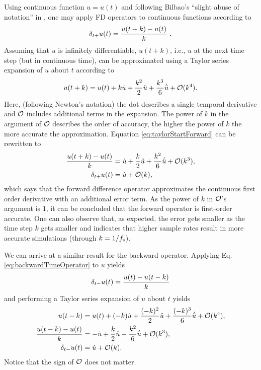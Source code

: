 Using continuous function $u=u(t)$ and following Bilbao's ``slight abuse of notation'' in \cite{theBible}, one may apply FD operators to continuous functions according to 
\begin{equation}\label{eq:forwardTimeCont}
    \delta_{t+} u(t) = \frac{u(t+k) - u(t)}{k}\ .
\end{equation}
%
Assuming that $u$ is infinitely differentiable, $u(t+k)$, i.e., $u$ at the next time step (but in continuous time), can be approximated using a Taylor series expansion of $u$ about $t$ according to
\begin{equation}\label{eq:taylorStartForward}
    u(t+k) = u(t) + k \dot u + \frac{k^2}{2} \ddot u + \frac{k^3}{6} \dot{\ddot{u}} + \mathcal{O}(k^4).
\end{equation}
Here, (following Newton's notation) the dot describes a single temporal derivative and $\mathcal{O}$ includes additional terms in the expansion. The power of $k$ in the argument of $\mathcal{O}$ describes the order of accuracy, the higher the power of $k$ the more accurate the approximation. Equation \eqref{eq:taylorStartForward} can be rewritten to 
\begin{align}
    \frac{u(t+k) - u(t)}{k} &= \dot u + \frac{k}{2} \ddot u +\frac{k^2}{6} \dot{\ddot{u}} + \mathcal{O}(k^3),\nonumber\\
    \delta_{t+} u(t) &= \dot u + \mathcal{O}(k),
\end{align}
which says that the forward difference operator approximates the continuous first order derivative with an additional error term.
As the power of $k$ in $\mathcal{O}$'s argument is $1$, it can be concluded that the forward operator is first-order accurate. One can also observe that, as expected, the error gets smaller as the time step $k$ gets smaller and indicates that higher sample rates result in more accurate simulations (through $k=1/f_\text{s}$).

We can arrive at a similar result for the backward operator. Applying Eq. \eqref{eq:backwardTimeOperator} to $u$ yields
\begin{equation}
    \delta_{t-} u(t) = \frac{u(t) - u(t-k)}{k}
\end{equation}
and performing a Taylor series expansion of $u$ about $t$ yields
\begin{align}
    u(t-k) &= u(t) + (-k) \dot u + \frac{(-k)^2}{2} \ddot u +\frac{(-k)^3}{6}\dot{\ddot{u}} + \mathcal{O}(k^4),\label{eq:taylorStartBackward}\\
    \frac{u(t-k) - u(t)}{k} &= -\dot u + \frac{k}{2} \ddot u - \frac{k^2}{6}\dot{\ddot{u}} + \mathcal{O}(k^3),\nonumber\\
    \delta_{t-} u(t) &= \dot u + \mathcal{O}(k).
\end{align}
Notice that the sign of $\mathcal{O}$ does not matter.

